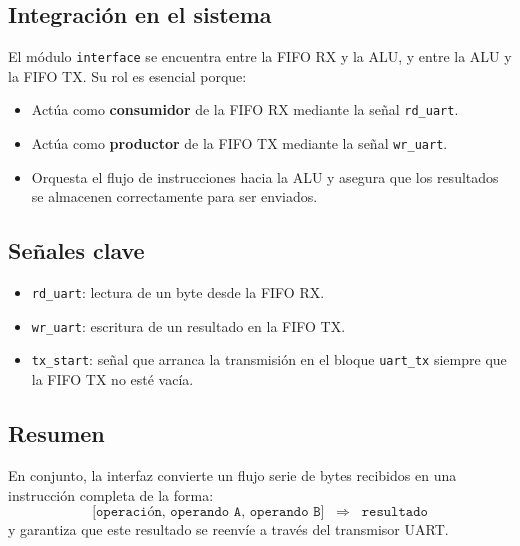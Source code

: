 \subsection{Integración en el sistema}
El módulo \texttt{interface} se encuentra entre la FIFO RX y la ALU, y entre la ALU y la FIFO TX.  
Su rol es esencial porque:
\begin{itemize}
    \item Actúa como \textbf{consumidor} de la FIFO RX mediante la señal \texttt{rd\_uart}.
    \item Actúa como \textbf{productor} de la FIFO TX mediante la señal \texttt{wr\_uart}.
    \item Orquesta el flujo de instrucciones hacia la ALU y asegura que los resultados se almacenen correctamente para ser enviados.
\end{itemize}

\subsection{Señales clave}
\begin{itemize}
    \item \texttt{rd\_uart}: lectura de un byte desde la FIFO RX.
    \item \texttt{wr\_uart}: escritura de un resultado en la FIFO TX.
    \item \texttt{tx\_start}: señal que arranca la transmisión en el bloque \texttt{uart\_tx} siempre que la FIFO TX no esté vacía.
\end{itemize}

\subsection{Resumen}
En conjunto, la interfaz convierte un flujo serie de bytes recibidos en una instrucción completa de la forma:
\[
\texttt{[operación, operando A, operando B]} \;\;\;\Rightarrow\;\;\; \texttt{resultado}
\]
y garantiza que este resultado se reenvíe a través del transmisor UART.
